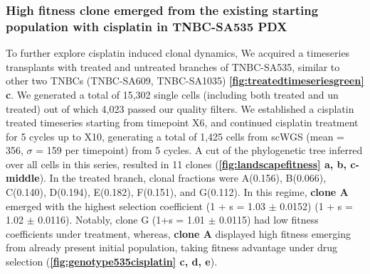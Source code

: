  
\subsubsection{High fitness clone emerged from the existing starting population with cisplatin in TNBC-SA535 PDX}
To further explore cisplatin induced clonal dynamics, We acquired a timeseries transplants with treated and untreated branches of TNBC-SA535, similar to other two TNBCs (TNBC-SA609, TNBC-SA1035) \textbf{\autoref{fig:treatedtimeseriesgreen} c}.
We generated a total of 15,302 single cells (including both treated and un treated) out of which 4,023 passed our quality filters.
We established a cisplatin treated timeseries starting from timepoint X6, and continued cisplatin treatment for 5 cycles up to X10, generating a total of 1,425 cells from scWGS (mean = 356, $\sigma$ = 159 per timepoint) from 5 cycles. A cut of the phylogenetic tree inferred over all cells in this series, resulted in 11 clones (\textbf{\autoref{fig:landscapefitness} a, b, c-middle}). 
In the treated branch, clonal fractions were A(0.156), B(0.066), C(0.140), D(0.194), E(0.182), F(0.151), and G(0.112). In this regime, \textbf{clone A} emerged with the highest selection coefficient (1 + s = 1.03 $\pm$  0.0152) (1 + s = 1.02 $\pm$ 0.0116). Notably, clone G (1+s = 1.01 $\pm$ 0.0115) had low fitness coefficients under treatment, whereas, \textbf{clone A} displayed high fitness emerging from already present initial population, taking fitness advantage under drug selection (\textbf{\autoref{fig:genotype535cisplatin} c, d, e}).



